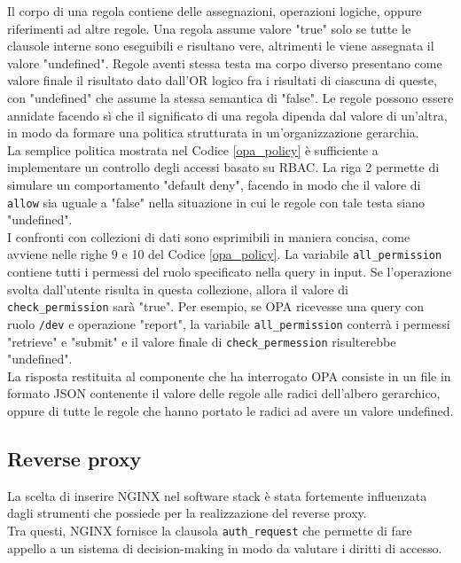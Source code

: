 Il corpo di una regola contiene delle assegnazioni, operazioni logiche, oppure riferimenti ad altre regole. Una regola assume valore "true" 
solo se tutte le clausole interne sono eseguibili e risultano vere, altrimenti le viene assegnata il valore "undefined". Regole aventi stessa testa ma corpo diverso presentano come valore finale 
il risultato dato dall'OR logico fra i risultati di ciascuna di queste, con "undefined" che assume la stessa semantica di "false". 
Le regole possono essere annidate facendo sì che il significato di una regola dipenda dal valore di un'altra, in modo da formare una politica strutturata in un'organizzazione gerarchia. 
\\ La semplice politica mostrata nel Codice \ref*{opa_policy} è sufficiente a implementare 
un controllo degli accessi basato su RBAC. 
La riga 2 permette di simulare un comportamento "default deny", facendo in modo che il valore di \texttt{allow} sia uguale a "false" 
nella situazione in cui le regole con tale testa siano "undefined".  \\ 
I confronti con collezioni di dati sono esprimibili in maniera concisa, come avviene nelle righe 9 e 10 del Codice \ref*{opa_policy}. 
La variabile \texttt{all\_permission} contiene tutti i permessi del ruolo specificato nella query in input. 
Se l'operazione svolta dall'utente risulta in questa collezione, allora il valore di \texttt{check\_permission} sarà "true". 
Per esempio, se OPA ricevesse una query con ruolo \texttt{/dev} e operazione "report", la variabile \texttt{all\_permission} conterrà i permessi 
"retrieve" e "submit" e il valore finale di \texttt{check\_permession} risulterebbe "undefined".
\\ La risposta restituita al componente che ha interrogato OPA consiste in un file in formato JSON contenente il valore 
delle regole alle radici dell'albero gerarchico, oppure di tutte le regole che hanno portato le radici ad avere un valore undefined. 


\subsection{Reverse proxy}
La scelta di inserire NGINX nel software stack è stata fortemente influenzata dagli strumenti che possiede per la realizzazione 
del reverse proxy. 
\\ Tra questi, NGINX fornisce la clausola \texttt{auth\_request} che permette di fare appello a un sistema di decision-making in modo da valutare
i diritti di accesso. 

